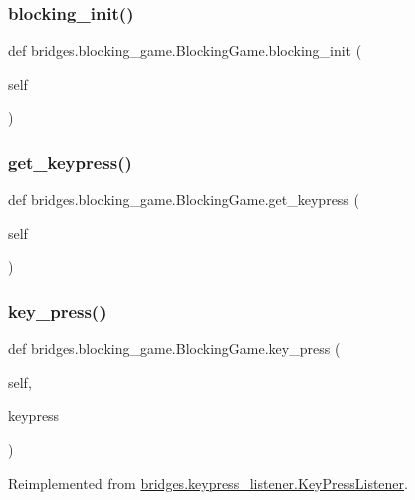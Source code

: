 \subsubsection{\texorpdfstring{blocking\_init()}{blocking\_init()}}
{\footnotesize\ttfamily def bridges.\+blocking\+\_\+game.\+Blocking\+Game.\+blocking\+\_\+init (\begin{DoxyParamCaption}\item[{}]{self }\end{DoxyParamCaption})}

\mbox{\label{classbridges_1_1blocking__game_1_1_blocking_game_a4dd145a1378d6f96112b8b73343e296a}} 
\subsubsection{\texorpdfstring{get\_keypress()}{get\_keypress()}}
{\footnotesize\ttfamily def bridges.\+blocking\+\_\+game.\+Blocking\+Game.\+get\+\_\+keypress (\begin{DoxyParamCaption}\item[{}]{self }\end{DoxyParamCaption})}

\mbox{\label{classbridges_1_1blocking__game_1_1_blocking_game_aa8cda5f9304b87b66f6794a1b1f5a7db}} 
\subsubsection{\texorpdfstring{key\_press()}{key\_press()}}
{\footnotesize\ttfamily def bridges.\+blocking\+\_\+game.\+Blocking\+Game.\+key\+\_\+press (\begin{DoxyParamCaption}\item[{}]{self,  }\item[{}]{keypress }\end{DoxyParamCaption})}



Reimplemented from \mbox{\hyperlink{classbridges_1_1keypress__listener_1_1_key_press_listener_a0a7b29de00fd412da075d30b8aa61f0d}{bridges.\+keypress\+\_\+listener.\+Key\+Press\+Listener}}.

